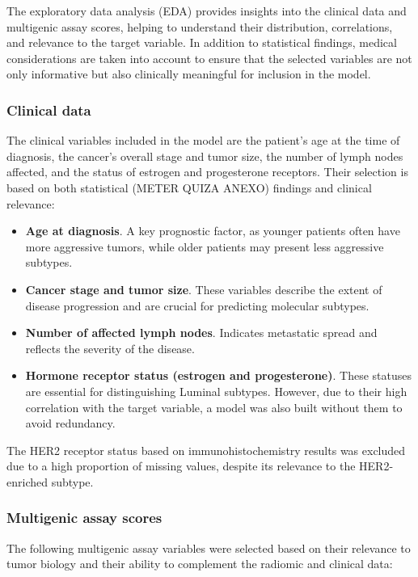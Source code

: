 \documentclass[conference]{IEEEtran}
\begin{document}
The exploratory data analysis (EDA) provides insights into the clinical data and multigenic assay scores, helping to understand their distribution, correlations, and relevance to the target variable. In addition to statistical findings, medical considerations are taken into account to ensure that the selected variables are not only informative but also clinically meaningful for inclusion in the model.

\subsubsection{Clinical data}

The clinical variables included in the model are the patient's age at the time of diagnosis, the cancer's overall stage and tumor size, the number of lymph nodes affected, and the status of estrogen and progesterone receptors. Their selection is based on both statistical  (METER QUIZA ANEXO) findings and clinical relevance:

\begin{itemize}
    \item \textbf{Age at diagnosis}. A key prognostic factor, as younger patients often have more aggressive tumors, while older patients may present less aggressive subtypes.
    \item \textbf{Cancer stage and tumor size}. These variables describe the extent of disease progression and are crucial for predicting molecular subtypes.
    \item \textbf{Number of affected lymph nodes}.  Indicates metastatic spread and reflects the severity of the disease.
    \item \textbf{Hormone receptor status (estrogen and progesterone)}. These statuses are essential for distinguishing Luminal subtypes. However, due to their high correlation with the target variable, a model was also built without them to avoid redundancy.
\end{itemize}

The HER2 receptor status based on immunohistochemistry results was excluded due to a high proportion of missing values, despite its relevance to the HER2-enriched subtype.

\subsubsection{Multigenic assay scores}

The following multigenic assay variables were selected based on their relevance to tumor biology and their ability to complement the radiomic and clinical data:
\end{document}
